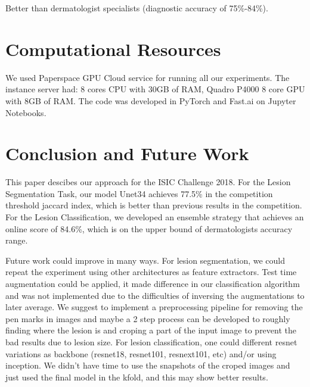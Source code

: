 \documentclass[conference]{IEEEtran}
\begin{document}
Better than dermatologist specialists (diagnostic accuracy of 75\%-84\%).

\section{Computational Resources\label{resources}}
We used Paperspace GPU Cloud service for running all our experiments. The instance server had: 8 cores CPU with 30GB of RAM, Quadro P4000 8 core GPU with 8GB of RAM. 
The code was developed in PyTorch and Fast.ai\cite{fastai} on Jupyter Notebooks.
\section{Conclusion and Future Work}

This paper descibes our approach for the ISIC Challenge 2018. For the Lesion Segmentation Task, our model Unet34 achieves 77.5\% in the competition threshold jaccard index, which is better than previous results in the competition. For the Lesion Classification, we developed an ensemble strategy that achieves an online score of 84.6\%, which is on the upper bound of dermatologists accuracy range.

Future work could improve in many ways. For lesion segmentation, we could repeat the experiment using other architectures as feature extractors. Test time augmentation could be applied, it made difference in our classification algorithm and was not implemented due to the difficulties of inversing the augmentations to later average.  We suggest to implement a preprocessing pipeline for removing the pen marks in images and maybe a 2 step process can be developed to roughly finding where the lesion is and croping a part of the input image to prevent the bad results due to lesion size. For lesion classification, one could different resnet variations as backbone (resnet18, resnet101, resnext101, etc) and/or using inception. We didn't have time to use the snapshots of the croped images and just used the final model in the kfold, and this may show better results.




\end{document}
